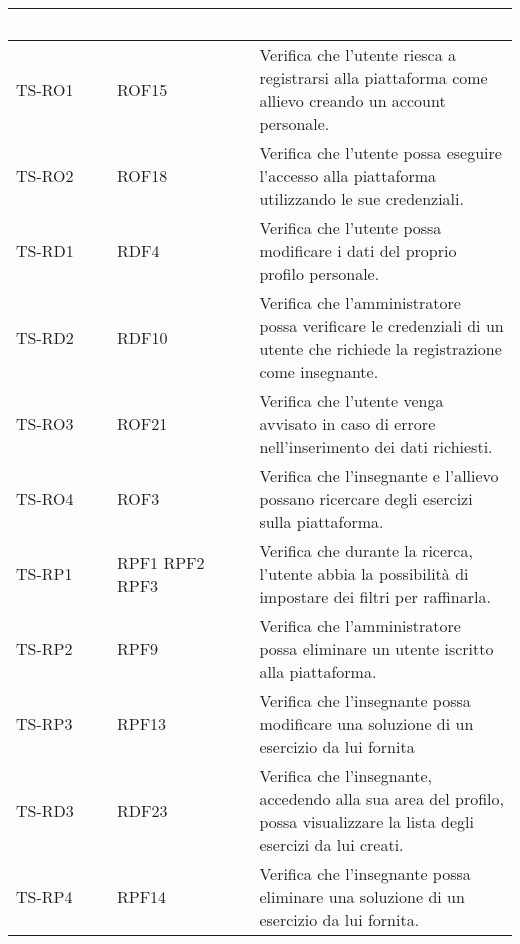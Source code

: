 	\begin{longtable}{|>{\centering\arraybackslash}m{1.6cm}|>{\centering\arraybackslash}m{1.7cm}|m{6.41cm}|}		
		\rowcolor{LightBlue}
		\textbf{\textcolor{white}{Codice\newline test}}
		& \textbf{\textcolor{white}{Codice\newline requisito}}
		& \multicolumn{1}{|c|}{\textbf{\textcolor{white}{ Descrizione}}}\\
		\hline
		\rowcolor{LightGray}
		TS-RO1
		& ROF15
		& Verifica che l'utente riesca a registrarsi alla piattaforma come allievo creando un account personale. 
		\\ \hline
		\rowcolor{white}
		TS-RO2
		& ROF18 
		& Verifica che l'utente possa eseguire l'accesso alla piattaforma utilizzando le sue credenziali.
		\\ \hline
		\rowcolor{LightGray}
		TS-RD1
		& RDF4 
		& Verifica che l'utente possa modificare i dati del proprio profilo personale.
		\\ \hline
		\rowcolor{white}
		TS-RD2
		& RDF10 
		& Verifica che l'amministratore possa verificare le credenziali di un utente che richiede la registrazione come insegnante. 
		\\ \hline
		\rowcolor{LightGray}
		TS-RO3
		& ROF21 
		& Verifica che l'utente venga avvisato in caso di errore nell'inserimento dei dati richiesti.
		\\ \hline
		\rowcolor{white}
		TS-RO4		
		& ROF3 
		& Verifica che l'insegnante e l'allievo possano ricercare degli esercizi sulla piattaforma.
		\\ \hline
		\rowcolor{LightGray}
		TS-RP1		
		& RPF1 RPF2 RPF3 
		& Verifica che durante la ricerca, l'utente abbia la possibilità di impostare dei filtri per raffinarla. 		
		\\ \hline
		\rowcolor{LightGray}
		TS-RP2		
		& RPF9 
		& Verifica che l'amministratore possa eliminare un utente iscritto alla piattaforma.
		\\ \hline
		\rowcolor{white}
		TS-RP3		
		& RPF13 
		& Verifica che l'insegnante possa modificare una soluzione di un esercizio da lui fornita
		\\ \hline
		\rowcolor{LightGray}
		TS-RD3		
		& RDF23
		& Verifica che l'insegnante, accedendo alla sua area del profilo, possa visualizzare la lista degli esercizi da lui creati. 
		\\ \hline
		\rowcolor{white}
		TS-RP4		
		& RPF14 
		& Verifica che l'insegnante possa eliminare una soluzione di un esercizio da lui fornita. 
		\\ \hline

\end{longtable}
